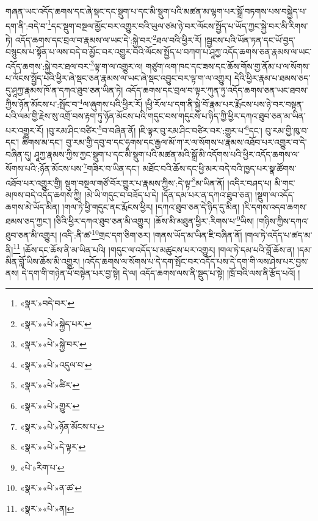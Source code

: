གཞན་ཡང་འདོད་ཆགས་དང་ཞེ་སྡང་དང་སྡུག་པ་དང་མི་སྡུག་པའི་མཚན་མ་ལྷག་པར་སྒྲོ་བཏགས་པས་བསྐྱེད་པ་དག་ནི་:བདེ་བ་\footnote{«སྣར་»བདེ་བར་}དང་སྡུག་བསྔལ་མྱོང་བར་འགྱུར་བའི་ཡུལ་ཙམ་ཉེ་བར་ལོངས་སྤྱོད་པ་ཡོད་ཀྱང་སྐྱེ་བར་མི་རིགས་ཏེ། འདོད་ཆགས་དང་བྲལ་བ་རྣམས་ལ་ཡང་དེ་:སྐྱེ་བར་\footnote{«སྣར་»«པེ་»སྐྱེད་པར་}ཐལ་བའི་ཕྱིར་རོ། །སྦྱངས་པའི་ཡོན་ཏན་དང་ཡོ་བྱད་བསྙུངས་པ་སྟོན་པ་ལས་བདེ་བ་མྱོང་བར་འགྱུར་བའི་ལོངས་སྤྱོད་པ་བཀག་པ་ཤཱཀྱ་འདོད་ཆགས་ཅན་རྣམས་ལ་ཡང་འདོད་ཆགས་:སྐྱེ་བར་ཐལ་བར་\footnote{«སྣར་»«པེ་»སྐྱེ་བར་}ལྟ་ག་ལ་འགྱུར་ལ། གཙུག་ལག་ཁང་དང་ཟས་དང་ཆོས་གོས་གྱ་ནོམ་པ་ལ་སོགས་པ་ལོངས་སྤྱོད་པའི་ཕྱིར་ཞེ་སྡང་ཅན་རྣམས་ལ་ཡང་ཞེ་སྡང་འབྱུང་བར་ལྟ་ག་ལ་འགྱུར། དེའི་ཕྱིར་རྣམ་པ་ཐམས་ཅད་དུ་ཤཱཀྱ་རྣམས་ཁོ་ན་དཀའ་ཐུབ་ཅན་ཡིན་ཏེ། འདོད་ཆགས་དང་བྲལ་བ་ལྟར་ཀུན་ཏུ་འདོད་ཆགས་ཅན་ཡང་ཐབས་ཀྱིས་ཉོན་མོངས་པ་:སྤོང་བ་\footnote{«སྣར་»«པེ་»འདུལ་བ་}ལ་ཞུགས་པའི་ཕྱིར་རོ། །ཕྱི་རོལ་པ་དག་ནི་སྐྱེ་བོ་རྣམ་པར་རྨོངས་པས་ཉེ་བར་བསྟན་པའི་ལམ་གྱི་རྗེས་སུ་འགྲོ་བས་རྟག་ཏུ་ཉོན་མོངས་པའི་གདུང་བས་གདུངས་པ་ཉིད་ཀྱི་ཕྱིར་དཀའ་ཐུབ་ཅན་མ་ཡིན་པར་འགྱུར་རོ། །བུ་རམ་ཤིང་བཙིར་\footnote{«སྣར་»«པེ་»ཚིར་}བ་བཞིན་ནོ། །ཇི་ལྟར་བུ་རམ་ཤིང་བཙིར་བར་:གྱུར་པ་\footnote{«སྣར་»«པེ་»གྱུར་}དང་། བུ་རམ་གྱི་ཁུ་བ་དང་། ཚིགས་མ་དང་། བུ་རམ་གྱི་དབུ་བ་དང་ཧྭགས་དང་རྒྱལ་མོ་ཀ་ར་ལ་སོགས་པ་རྣམས་འཐོབ་པར་འགྱུར་བ་དེ་བཞིན་དུ། ཤཱཀྱ་རྣམས་ཀྱིས་ཀྱང་སྡུག་པ་དང་མི་སྡུག་པའི་མཚན་མའི་སྒྲོ་མི་འདོགས་པའི་ཕྱིར་འདོད་ཆགས་ལ་སོགས་པའི་:ཉོན་མོངས་པས་\footnote{«སྣར་»«པེ་»ཉོན་མོངས་པ་}གཟིར་བ་ཡིན་དང་། མཐོང་བའི་ཆོས་དང་ཕྱི་མར་བདེ་བའི་ཁྱད་པར་སྣ་ཚོགས་འཐོབ་པར་འགྱུར་གྱི། སྡུག་བསྔལ་གཙོ་བོར་གྱུར་པ་རྣམས་ཀྱིས་:དེ་ལྟ་\footnote{«སྣར་»«པེ་»དེ་ལྟར་}མ་ཡིན་ནོ། །འདིར་བཤད་པ། མི་གང་མཁས་བདེ་འདོད་ཆགས་ཀྱི། །མེ་ཡི་གདུང་བ་བཟོད་པ་དེ། །དོན་དམ་པར་ན་དཀའ་ཐུབ་ཅན། །སྡུག་ལ་འདོད་ཆགས་མེ་ཡོད་མིན། །གལ་ཏེ་ཕྱི་གདུང་ནང་རྨོངས་ཕྱིར། །དཀའ་ཐུབ་ཅན་དེ་ཉིད་དུ་མིན། །རི་དགས་འདབ་ཆགས་ཐམས་ཅད་ཀྱང་། །ཅིའི་ཕྱིར་དཀའ་ཐུབ་ཅན་མི་འགྱུར། །ཆོས་མི་མཐུན་ཕྱིར་:རིགས་པ་\footnote{«པེ་»རིག་པ་}ཡིས། །གཉིས་ཀྱིས་དཀའ་ཐུབ་ཅན་མི་འགྱུར། །འདི་:ནི་ཚ་\footnote{«སྣར་»«པེ་»ན་ཚ་}གྲང་དག་ཅིག་ཅར། །གནས་ཡོད་མ་ཡིན་ཇི་བཞིན་ནོ། །གལ་ཏེ་འདོད་པ་ཚད་མ་ནི།\footnote{«སྣར་»«པེ་»ན།} །ཆོས་དང་ཆོས་ནི་མ་ཡིན་པའི། །གདུང་ལ་འདོད་པ་མཚུངས་པར་འགྱུར། །གལ་ཏེ་དམ་པའི་བློ་ཆོས་ན། །དམ་མིན་བློ་ཡིས་ཆོས་མི་འགྱུར། །འདོད་ཆགས་ལ་སོགས་པ་དེ་དག་སྤོང་བར་འདོད་པས་དེ་དག་གི་ལས་ཤེས་པར་བྱས་ནས། དེ་དག་གི་གཉེན་པོ་བསྟེན་པར་བྱ་སྟེ། དེ་ལ། འདོད་ཆགས་ལས་ནི་སྡུད་པ་སྟེ། །ཁྲོ་བའི་ལས་ནི་རྩོད་པའོ། །
